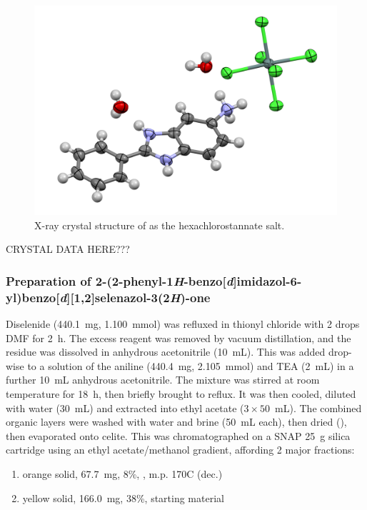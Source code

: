 \begin{refsection}
\begin{figure}[ht]
    \centering
    \includegraphics[width=0.8\linewidth]{Figures/rhs-amine-xray.pdf}
    \caption{X-ray crystal structure of  as the hexachlorostannate salt.}\label{fig:rhs-amine-xray}
\end{figure}

CRYSTAL DATA HERE???

\subsubsection[Preparation of \refcmpd{ebs-rhs-ph}]{Preparation of 2-(2-phenyl-1\emph{H}-benzo[\emph{d}]imidazol-6-yl)benzo[\emph{d}][1,2]\-selenazol-3(2\emph{H})-one }
Diselenide  (440.1~mg, 1.100~mmol) was refluxed in thionyl chloride with 2 drops DMF for 2~h.
The excess reagent was removed by vacuum distillation, and the residue was dissolved in anhydrous acetonitrile (10~mL).
This was added drop-wise to a solution of the aniline  (440.4~mg, 2.105~mmol) and TEA (2~mL) in a further 10~mL anhydrous acetonitrile.
The mixture was stirred at room temperature for 18~h, then briefly brought to reflux.
It was then cooled, diluted with water (30~mL) and extracted into ethyl acetate ($3\times50$~mL).
The combined organic layers were washed with water and brine (50~mL each), then dried (), then evaporated onto celite.
This was chromatographed on a SNAP 25~g silica cartridge using an ethyl acetate/methanol gradient, affording 2 major fractions:
\begin{enumerate}
    \item orange solid, 67.7~mg, 8\%, , m.p. 170\degree{}C (dec.)
    \item yellow solid, 166.0~mg, 38\%, starting material 
\end{enumerate}


\end{refsection}
